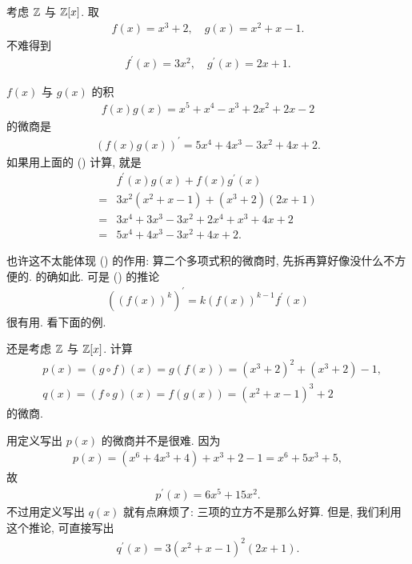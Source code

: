 \begin{example}
    考虑 $\mathbb{Z}$ 与 $\mathbb{Z}[x]$. 取
    \begin{align*}
        f(x) = x^3 + 2, \quad g(x) = x^2 + x - 1.
    \end{align*}
    不难得到
    \begin{align*}
        f^{\prime} (x) = 3x^2, \quad g^{\prime} (x) = 2x + 1.
    \end{align*}

    $f(x)$ 与 $g(x)$ 的积
    \begin{align*}
        f(x) g(x) = x^5 + x^4 - x^3 + 2x^2 + 2x - 2
    \end{align*}
    的微商是
    \begin{align*}
        (f(x) g(x))^{\prime} = 5x^4 + 4x^3 - 3x^2 + 4x + 2.
    \end{align*}
    如果用上面的 (\myStar) 计算, 就是
    \begin{align*}
             & f^{\prime} (x) g(x) + f(x) g^{\prime} (x) \\
        = {} & 3x^2 (x^2 + x - 1) + (x^3 + 2) (2x + 1)   \\
        = {} & 3x^4 + 3x^3 - 3x^2 + 2x^4 + x^3 + 4x + 2  \\
        = {} & 5x^4 + 4x^3 - 3x^2 + 4x + 2.
    \end{align*}
\end{example}

也许这不太能体现 (\myStar) 的作用: 算二个多项式积的微商时, 先拆再算好像没什么不方便的. 的确如此. 可是 (\myStar) 的推论
\begin{align*}
    ((f(x))^k)^{\prime} = k(f(x))^{k-1} f^{\prime}(x)
\end{align*}
很有用. 看下面的例.

\begin{example}
    还是考虑 $\mathbb{Z}$ 与 $\mathbb{Z}[x]$. 计算
    \begin{align*}
         & p(x) = (g \circ f) (x) = g(f(x)) = (x^3 + 2)^2 + (x^3 + 2) - 1, \\
         & q(x) = (f \circ g) (x) = f(g(x)) = (x^2 + x - 1)^3 + 2
    \end{align*}
    的微商.

    用定义写出 $p(x)$ 的微商并不是很难. 因为
    \begin{align*}
        p(x) = (x^6 + 4x^3 + 4) + x^3 + 2 - 1 = x^6 + 5x^3 + 5,
    \end{align*}
    故
    \begin{align*}
        p^{\prime} (x) = 6x^5 + 15x^2.
    \end{align*}
    不过用定义写出 $q(x)$ 就有点麻烦了: 三项的立方不是那么好算. 但是, 我们利用这个推论, 可直接写出
    \begin{align*}
        q^{\prime} (x) = 3(x^2 + x - 1)^2 (2x + 1).
    \end{align*}
\end{example}

